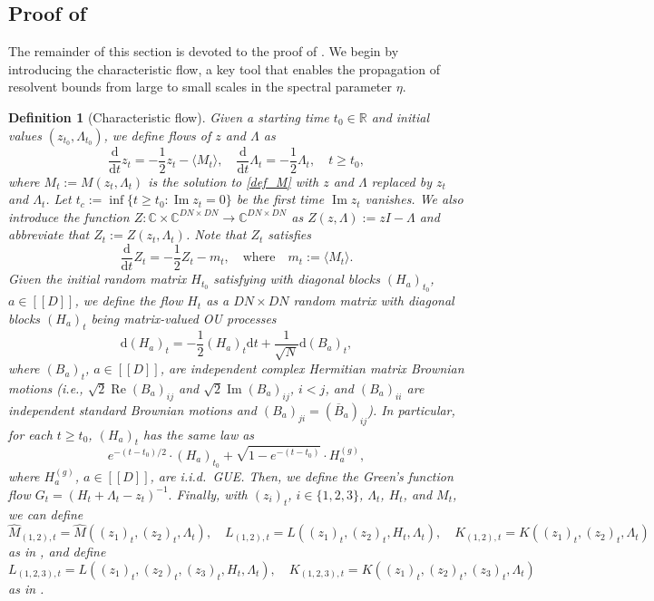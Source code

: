 \documentclass[10pt,reqno]{amsart}
\numberwithin{equation}{section}
\numberwithin{figure}{section}
\theoremstyle{plain} %
\newtheorem{definition}[theorem]{Definition}
\theoremstyle{definition} %
\newcommand{\wh}{\widehat}
\newcommand{\cob}{\color{darkblue}}
\newcommand{\nc}{\normalcolor}
\newcommand{\R}{\mathbb{R}}
\newcommand{\C}{\mathbb{C}}
\newcommand{\dd}{\mathrm{d}}
\newcommand{\qq}[1]{[\![{#1}]\!]}
\DeclareMathOperator{\re}{\mathrm{Re}}
\DeclareMathOperator{\im}{\mathrm{Im}}
\newcommand{\be}{\begin{equation}}
\newcommand{\ee}{\end{equation}}
\newcommand{\e}{{\varepsilon}}
\numberwithin{equation}{section}
\begin{document}
\subsection{Proof of }
The remainder of this section is devoted to the proof of . We begin by introducing the characteristic flow, a key tool that enables the propagation of resolvent bounds from large to small scales in the spectral parameter $\eta$.

\begin{definition}[Characteristic flow]\label{flow} 
Given a starting time $t_0\in \R$ and initial values $(z_{t_0},\Lambda_{t_0})$, we define flows of $z$ and $\Lambda$ as 
\be\label{eq:deterflow} \frac{\dd}{\dd t}z_t=-\frac12 z_t- \langle M_t\rangle,\quad   \frac{\dd}{\dd t}\Lambda_t=-\frac12 \Lambda_t,\quad t\ge t_0, 
\ee
where $M_t:= M(z_t, \Lambda_t)$ is the solution to \eqref{def_M} with $z$ and $\Lambda$ replaced by $z_t$ and $\Lambda_t$. Let $t_c:=\inf\{t\ge t_0: \im z_{t}=0\}$ be the first time $\im z_t$ vanishes. We also introduce the function $Z:\C\times \C^{DN\times DN}\to\C^{DN\times DN} $ as $Z(z ,\Lambda ):=z I - \Lambda$ and abbreviate that $Z_t:=Z(z_t , \Lambda_t )$. Note that $Z_t$ satisfies
\be\label{eq:Zt}
 \frac{\dd}{\dd t}Z_t=-\frac12 Z_t- m_t,\quad \text{where}\quad m_t:=\langle M_t\rangle .
\ee
Given the initial random matrix $H_{t_0}$ satisfying  with diagonal blocks $(H_a)_{t_0}$, $a\in \qq D$, we define the flow $H_t$ as a $DN\times DN$ random matrix with diagonal blocks $(H_a)_{t}$ being matrix-valued OU processes 
\be\label{eq:Ht} \dd (H_a)_t = -\frac12(H_a)_t\dd t + \frac{1}{\sqrt{N}}\dd (B_a)_t,\ee
where $(B_a)_t$, $a\in \qq D$, are independent complex Hermitian matrix Brownian motions (i.e., $\sqrt{2} \re (B_a)_{ij}$ and $ \sqrt{2} \im (B_a)_{i j}$, $i<j$, and $(B_a)_{i i}$ are independent standard Brownian motions and $(B_a)_{j i}=(\overline{B}_a)_{i j}$). In particular, for each $t\ge t_0$, $(H_a)_t$ has the same law as  
\be\label{eq:Gauss_div}
e^{-(t-t_0)/2}\cdot  (H_a)_{t_0}+ \sqrt{1-e^{-(t-t_0)}}\cdot H_a^{(g)},
\ee
where $H_a^{(g)}$, $a\in \qq D$, are i.i.d.~GUE. Then, we define the Green's function flow 
$G_t=\left(H_t+\Lambda_t-z_t\right)^{-1}.$
Finally, with $(z_{i})_t$, $i\in \{1,2,3\}$, $\Lambda_t$, $H_t$, and $M_t$, we can define 
$$ \wh M_{(1,2),t}=\wh M((z_{1})_t,(z_{2})_t,\Lambda_t),\quad L_{(1,2),t}=L((z_{1})_t,(z_{2})_t,H_t, \Lambda_t),\quad K_{(1,2),t}=K((z_{1})_t,(z_{2})_t,\Lambda_t)$$ 
as in , and define
$$L_{(1,2,3),t}=L((z_{1})_t, (z_{2})_t, (z_{3})_t, H_t, \Lambda_t),\quad K_{(1,2,3),t}=K((z_{1})_t, (z_{2})_t, (z_{3})_t, \Lambda_t)$$ 
as in . 
\end{definition}
\end{document}
